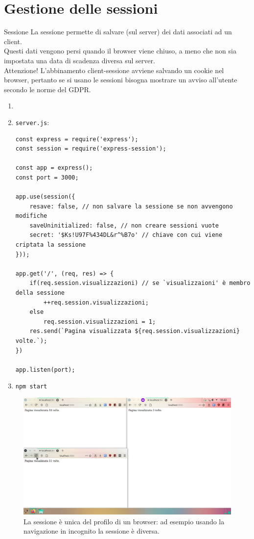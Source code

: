 \section[Sessioni]{Gestione delle sessioni}\transfade\centering
\begin{frame}{Sessione}
  La sessione permette di salvare (sul server) dei dati associati ad un client.\smallskip\\\pause
  Questi dati vengono persi quando il browser viene chiuso, a meno che non sia impostata una data di scadenza diversa sul server.\pause\bigskip\\
  \alert{Attenzione!} L'abbinamento client-sessione avviene salvando un cookie nel browser, pertanto se si usano le sessioni bisogna mostrare un avviso all'utente secondo le norme del GDPR.
\end{frame}
\begin{frame}[fragile]\transfade\centering
  \begin{enumerate}
    \item {}
    \item {\small\texttt{server.js}:}
    \begin{verbatim}
const express = require('express');
const session = require('express-session');

const app = express();
const port = 3000;

app.use(session({
    resave: false, // non salvare la sessione se non avvengono modifiche
    saveUninitialized: false, // non creare sessioni vuote
    secret: '$Ks!U97F%434DL&r^%B7o' // chiave con cui viene criptata la sessione
}));

app.get('/', (req, res) => {
    if(req.session.visualizzazioni) // se `visualizzaioni' è membro della sessione
        ++req.session.visualizzazioni;
    else
        req.session.visualizzazioni = 1;
    res.send(`Pagina visualizzata ${req.session.visualizzazioni} volte.`);
})

app.listen(port);
    \end{verbatim}
    \item \texttt{\small npm start}
  \end{enumerate}
\end{frame}

\begin{frame}
  \begin{figure}
    \includegraphics[height=.8\paperheight]{img/node/session}
    \caption{La sessione è unica del profilo di un browser: ad esempio usando la navigazione in incognito la sessione è diversa.}
  \end{figure}
\end{frame}